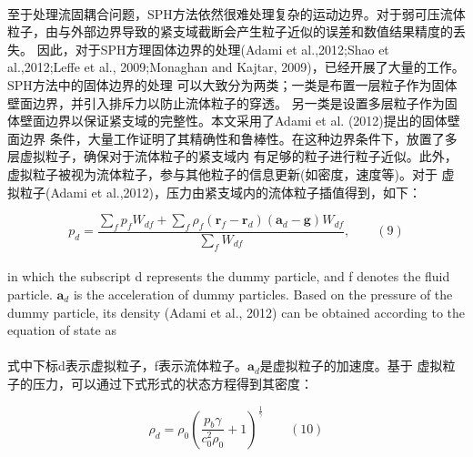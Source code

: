 \documentclass[UTF8]{ctexart}
\begin{document}
{{\paragraph{\quad}至于处理流固耦合问题，SPH方法依然很难处理复杂的运动边界。对于弱可压流体
                粒子，由与外部边界导致的紧支域截断会产生粒子近似的误差和数值结果精度的丢失。
                因此，对于SPH方理固体边界的处理(Adami et al.,2012;Shao et al.,2012;Leffe et al., 
                2009;Monaghan and Kajtar, 2009)，已经开展了大量的工作。SPH方法中的固体边界的处理
                可以大致分为两类；一类是布置一层粒子作为固体壁面边界，并引入排斥力以防止流体粒子的穿透。
                另一类是设置多层粒子作为固体壁面边界以保证紧支域的完整性。本文采用了Adami et al. (2012)提出的固体壁面边界
                条件，大量工作证明了其精确性和鲁棒性。在这种边界条件下，放置了多层虚拟粒子，确保对于流体粒子的紧支域内
                有足够的粒子进行粒子近似。此外，虚拟粒子被视为流体粒子，参与其他粒子的信息更新(如密度，速度等)。对于
                虚拟粒子(Adami et al.,2012)，压力由紧支域内的流体粒子插值得到，如下：

\begin{equation}
   p_d = \frac{\sum_{f}p_f W_{df} + \sum_{f}\rho_f(\mathbf{r}_f-\mathbf{r}_d)(\mathbf{a}_d-\mathbf{g})W_{df}}{\sum_{f}W_{df}}, \qquad (9)
\end{equation}

\paragraph{\quad}in which the subscript d represents the dummy particle, 
                and f denotes the fluid particle. $\mathbf{a}_d$ is the acceleration 
                of dummy particles. Based on the pressure of the dummy 
                particle, its density (Adami et al., 2012) can be obtained 
                according to the equation of state as
\paragraph{\quad}式中下标d表示虚拟粒子，f表示流体粒子。$\mathbf{a}_d$是虚拟粒子的加速度。基于
                虚拟粒子的压力，可以通过下式形式的状态方程得到其密度：


\begin{equation}
   \rho_d = \rho_0(\frac{p_b \gamma}{c_0^2\rho_0}+1)^{\frac{1}{\gamma}} \qquad (10)
\end{equation}

}}
\end{document}
